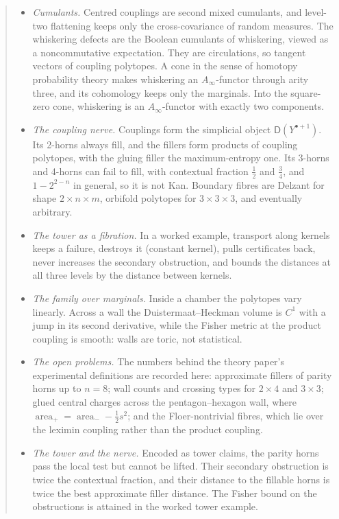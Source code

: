 \documentclass[11pt]{article}
\theoremstyle{definition}
\theoremstyle{remark}
\newcommand{\D}{\mathsf{D}}
\begin{document}
\begin{abstract}
\begin{itemize}[leftmargin=*]
  of the corresponding surface, with explicit central charges. We state what this does and does not
  connect.
\item \emph{Cumulants.} Centred couplings are second mixed cumulants, and level-two flattening keeps only
  the cross-covariance of random measures. The whiskering defects are the Boolean cumulants of
  whiskering, viewed as a noncommutative expectation. They are circulations, so tangent vectors of coupling
  polytopes. A cone in the sense of homotopy probability theory makes whiskering an $A_\infty$-functor through
  arity three, and its cohomology keeps only the marginals. Into the square-zero cone, whiskering is an
  $A_\infty$-functor with exactly two components.
\item \emph{The coupling nerve.} Couplings form the simplicial object $\D(Y^{\bullet+1})$. Its 2-horns always fill, and the
  fillers form products of coupling polytopes, with the gluing filler the maximum-entropy one. Its 3-horns and
  4-horns can fail to fill, with contextual fraction $\tfrac12$ and $\tfrac34$, and $1-2^{2-n}$ in general, so it is not Kan. Boundary fibres are
  Delzant for shape $2\times n\times m$, orbifold polytopes for $3\times3\times3$, and eventually arbitrary.
\item \emph{The tower as a fibration.} In a worked example, transport along kernels keeps a failure, destroys it
  (constant kernel), pulls certificates back, never increases the secondary obstruction, and bounds the
  distances at all three levels by the distance between kernels.
\item \emph{The family over marginals.} Inside a chamber the polytopes vary linearly. Across a wall the
  Duistermaat--Heckman volume is $C^1$ with a jump in its second derivative, while the Fisher metric at the
  product coupling is smooth: walls are toric, not statistical.
\item \emph{The open problems.} The numbers behind the theory paper's experimental definitions are recorded here:
  approximate fillers of parity horns up to $n=8$; wall counts and crossing types for $2\times4$ and $3\times3$; glued
  central charges across the pentagon--hexagon wall, where $\operatorname{area}_+=\operatorname{area}_--\frac12s^2$; and the
  Floer-nontrivial fibres, which lie over the leximin coupling rather than the product coupling.
\item \emph{The tower and the nerve.} Encoded as tower claims, the parity horns pass the local test but cannot be
  lifted. Their secondary obstruction is twice the contextual fraction, and their distance to the fillable horns is twice the
  best approximate filler distance. The Fisher bound on the obstructions is attained in the worked tower example.
\end{itemize}
\end{abstract}
\end{document}
